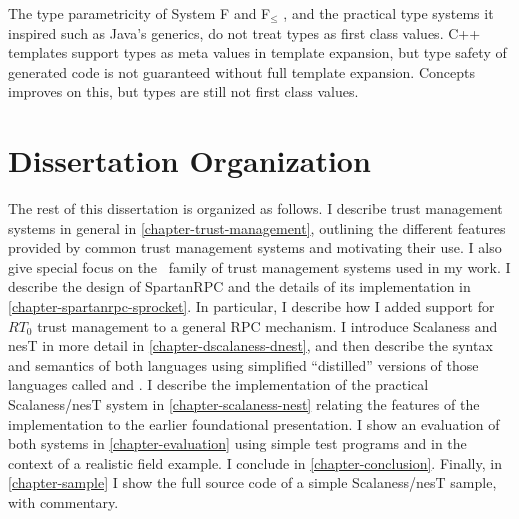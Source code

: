 The type parametricity of System F and F$_\le$ \cite{Cardelli-1985}, and the practical type
systems it inspired such as Java's generics, do not treat types as first class values. C++
templates support types as meta values in template expansion, but type safety of generated code
is not guaranteed without full template expansion. Concepts \cite{gregor06:_concepts} improves
on this, but types are still not first class values.

\section{Dissertation Organization}

The rest of this dissertation is organized as follows. I describe trust management systems in
general in \autoref{chapter-trust-management}, outlining the different features provided by
common trust management systems and motivating their use. I also give special focus on the \RT\
family of trust management systems used in my work. I describe the design of SpartanRPC and the
details of its implementation in \autoref{chapter-spartanrpc-sprocket}. In particular, I
describe how I added support for $RT_0$ trust management to a general RPC mechanism. I introduce
Scalaness and nesT in more detail in \autoref{chapter-dscalaness-dnest}, and then describe the
syntax and semantics of both languages using simplified ``distilled'' versions of those
languages called \newterm{DScalaness} and \newterm{DnesT}. I describe the implementation of the
practical Scalaness/nesT system in \autoref{chapter-scalaness-nest} relating the features of the
implementation to the earlier foundational presentation. I show an evaluation of both systems in
\autoref{chapter-evaluation} using simple test programs and in the context of a realistic field
example. I conclude in \autoref{chapter-conclusion}. Finally, in \autoref{chapter-sample} I show
the full source code of a simple Scalaness/nesT sample, with commentary.

